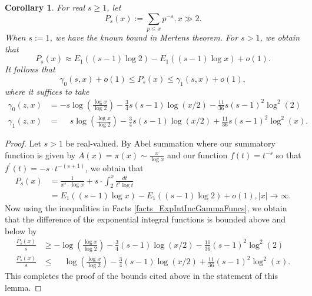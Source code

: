 \documentclass[11pt,reqno,a4letter]{article}
\numberwithin{figure}{section}
\numberwithin{table}{section}
\theoremstyle{plain}
\newtheorem{cor}[theorem]{Corollary}
\numberwithin{theorem}{section}
\theoremstyle{definition}
\newcommand{\NBRef}[1]{
     \todo[linecolor=green!85!white,backgroundcolor=orange!50!white,bordercolor=blue!30!black,textcolor=cyan!15!black,shadow,size=\small,fancyline]{
     \color{NBRefColor}{\textbf{#1}
     }
     }
}
\begin{document}
\begin{cor} 
\label{cor_PartialSumsOfReciprocalsOfPrimePowers} 
For real $s \geq 1$, let 
\[
P_s(x) := \sum_{p \leq x} p^{-s}, x \gg 2. 
\]
When $s := 1$, we have the known bound in Mertens theorem. For $s > 1$, we obtain that 
\[
P_s(x) \approx E_1((s-1) \log 2) - E_1((s-1) \log x) + o(1). 
\]
It follows that 
\[
\gamma_0(s, x) + o(1) \leq P_s(x) \leq \gamma_1(s, x) + o(1), 
\]
where it suffices to take 
\begin{align*}
\gamma_0(z, x) & = -s\log\left(\frac{\log x}{\log 2}\right) - \frac{3}{4}s(s-1) \log(x/2) - 
     \frac{11}{36} s(s-1)^2 \log^2(2) \\ 
\gamma_1(z, x) & = \phantom{-} s\log\left(\frac{\log x}{\log 2}\right) - \frac{3}{4}s(s-1) \log(x/2) + 
     \frac{11}{36} s(s-1)^2 \log^2(x). 
\end{align*}
\end{cor} 
\NBRef{A05-2020-04-26} 
\begin{proof} 
Let $s > 1$ be real-valued. 
By Abel summation where our summatory function is given by $A(x) = \pi(x) \sim \frac{x}{\log x}$ and 
our function $f(t) = t^{-s}$ so that $f^{\prime}(t) = -s \cdot t^{-(s+1)}$, we obtain that 
\begin{align*} 
P_s(x) & = \frac{1}{x^s \cdot \log x} + s \cdot \int_2^{x} \frac{dt}{t^s \log t} \\ 
     & = E_1((s-1) \log x) - E_1((s-1) \log 2) + o(1), |x| \rightarrow \infty. 
\end{align*} 
Now using the inequalities in Facts \ref{facts_ExpIntIncGammaFuncs}, we obtain that the 
difference of the exponential integral functions is bounded above and below by 
\begin{align*} 
\frac{P_s(x)}{s} & \geq -\log\left(\frac{\log x}{\log 2}\right) - \frac{3}{4}(s-1) \log(x/2) - 
     \frac{11}{36} (s-1)^2 \log^2(2) \\ 
\frac{P_s(x)}{s} & \leq \phantom{-} \log\left(\frac{\log x}{\log 2}\right) - \frac{3}{4}(s-1) \log(x/2) + 
     \frac{11}{36} (s-1)^2 \log^2(x). 
\end{align*} 
This completes the proof of the bounds cited above in the statement of this lemma. 
\end{proof} 
\end{document}
